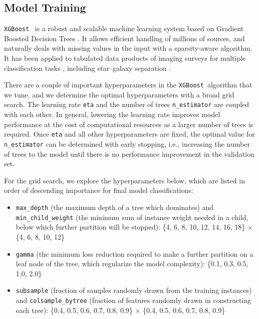 \documentclass[twocolumn,tighten]{aastex631}
\newcommand{\xgboost}{\texttt{XGBoost}}
\begin{document}
\begin{CJK*}{UTF8}{gbsn}
\section{Model Training}\label{sec:model}

\xgboost\ \citep{XGBoost_2016} is a robust and scalable machine learning system based on Gradient Boosted Decision Trees \citep{Friedman_2001}. It allows efficient handling of millions of sources, and naturally deals with missing values in the input with a sparsity-aware algorithm. It has been applied to tabulated data products of imaging surveys for multiple classification tasks \citep[e.g.,][]{Jin_2019, Nakoneczny_2021, Fu_2024, vonMarttens_2024, Zeraatgari_2024}, including star--galaxy separation \citep{Stoppa_2023}.

There are a couple of important hyperparameters in the \xgboost\ algorithm that we tune, and we determine the optimal hyperparameters with a broad grid search. The learning rate \texttt{eta} and the number of trees \texttt{n\_estimator} are coupled with each other. In general, lowering the learning rate improves model performance at the cost of computational resources as a larger number of trees is required. Once \texttt{eta} and all other hyperparameters are fixed, the optimal value for \texttt{n\_estimator} can be determined with early stopping, i.e., increasing the number of trees to the model until there is no performance improvement in the validation set. 

For the grid search, we explore the hyperparameters below, which are listed in order of descending importance for final model classifications:
\begin{itemize}
    \item \texttt{max\_depth} (the maximum depth of a tree which dominates) and \texttt{min\_child\_weight} (the minimum sum of instance weight needed in a child, below which further partition will be stopped): \{4, 6, 8, 10, 12, 14, 16, 18\} $\times$ \{4, 6, 8, 10, 12\}
    \item \texttt{gamma} (the minimum loss reduction required to make a further partition on a leaf node of the tree, which regularize the model complexity): \{0.1, 0.3, 0.5, 1.0, 2.0\}
    \item \texttt{subsample} (fraction of samples randomly drawn from the training instances) and \texttt{colsample\_bytree} (fraction of features randomly drawn in constructing each tree): \{0.4, 0.5, 0.6, 0.7, 0.8, 0.9\} $\times$ \{0.4, 0.5, 0.6, 0.7, 0.8, 0.9\}
\end{itemize}


\end{CJK*}
\end{document}
